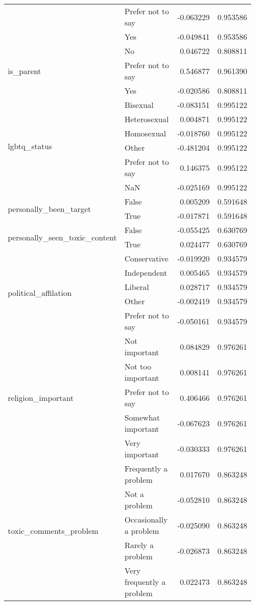 \begin{longtable}{llrr}
 & Prefer not to say & -0.063229 & 0.953586 \\
 & Yes & -0.049841 & 0.953586 \\
\cline{1-4}
\multirow[t]{3}{*}{is\_parent} & No & 0.046722 & 0.808811 \\
 & Prefer not to say & 0.546877 & 0.961390 \\
 & Yes & -0.020586 & 0.808811 \\
\cline{1-4}
\multirow[t]{6}{*}{lgbtq\_status} & Bisexual & -0.083151 & 0.995122 \\
 & Heterosexual & 0.004871 & 0.995122 \\
 & Homosexual & -0.018760 & 0.995122 \\
 & Other & -0.481204 & 0.995122 \\
 & Prefer not to say & 0.146375 & 0.995122 \\
 & NaN & -0.025169 & 0.995122 \\
\cline{1-4}
\multirow[t]{2}{*}{personally\_been\_target} & False & 0.005209 & 0.591648 \\
 & True & -0.017871 & 0.591648 \\
\cline{1-4}
\multirow[t]{2}{*}{personally\_seen\_toxic\_content} & False & -0.055425 & 0.630769 \\
 & True & 0.024477 & 0.630769 \\
\cline{1-4}
\multirow[t]{5}{*}{political\_affilation} & Conservative & -0.019920 & 0.934579 \\
 & Independent & 0.005465 & 0.934579 \\
 & Liberal & 0.028717 & 0.934579 \\
 & Other & -0.002419 & 0.934579 \\
 & Prefer not to say & -0.050161 & 0.934579 \\
\cline{1-4}
\multirow[t]{5}{*}{religion\_important} & Not important & 0.084829 & 0.976261 \\
 & Not too important & 0.008141 & 0.976261 \\
 & Prefer not to say & 0.406466 & 0.976261 \\
 & Somewhat important & -0.067623 & 0.976261 \\
 & Very important & -0.030333 & 0.976261 \\
\cline{1-4}
\multirow[t]{5}{*}{toxic\_comments\_problem} & Frequently a problem & 0.017670 & 0.863248 \\
 & Not a problem & -0.052810 & 0.863248 \\
 & Occasionally a problem & -0.025090 & 0.863248 \\
 & Rarely a problem & -0.026873 & 0.863248 \\
 & Very frequently a problem & 0.022473 & 0.863248 \\
\cline{1-4}
\end{longtable}
